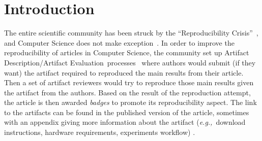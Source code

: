 \documentclass[sigconf,natbib=false]{acmart}
\newcommand{\eg}{\emph{e.g.,}}
\newcommand{\ad}{Artifact Description}
\newcommand{\aeval}{Artifact Evaluation}
\newcommand{\adae}{\ad/\aeval}
\newcommand{\todo}[1]{{\color{red}{TODO: #1}}}
\begin{document}

\section{Introduction}

% 

The entire scientific community has been struck by the ``Reproducibility Crisis''~\cite{baker500ScientistsLift2016}, and Computer Science does not make exception~\cite{collberg_repeatability_2015}.
In order to improve the reproducibility of articles in Computer Science, the community set up \adae\ processes~\cite{kidwell2016badges} where authors would submit (if they want) the artifact required to reproduced the main results from their article.
Then a set of artifact reviewers would try to reproduce those main results given the artifact from the authors.
Based on the result of the reproduction attempt, the article is then awarded \emph{badges} to promote its reproducibility aspect.
The link to the artifacts can be found in the published version of the article, sometimes with an appendix giving more information about the artifact (\eg\ download instructions, hardware requirements, experiments workflow) \cite{paperswithcode, kang2023papers, hong2013software}.
\end{document}
